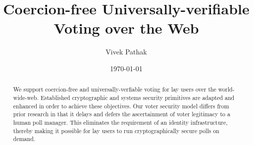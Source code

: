 \documentclass[12pt,draft]{article}
\title{ {\bf  Coercion-free Universally-verifiable Voting over the Web} }
\author{Vivek Pathak}
\date{\today}
\begin{document}
\maketitle

\begin{abstract}
  We support  coercion-free
  and universally-verfiable voting for lay users over the world-wide-web.
  Established cryptographic and systems
  security primitives are adapted and enhanced in order to
  achieve these objectives. 
  Our voter security model differs from prior research in that it delays and
  defers
  the ascertainment of voter legitimacy to a human poll manager.
  This eliminates the requirement of an identity infrastructure,
  thereby making it possible
  for lay users to run cryptographically secure polls on demand.
\end{abstract}

 







\end{document}
